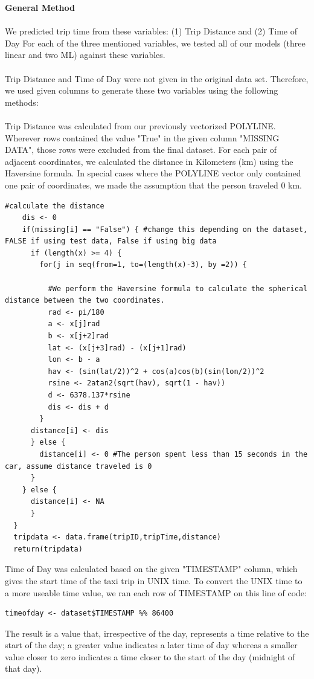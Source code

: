 \documentclass[letterpaper, 12 pt, conference]{article}
\begin{document}
\textbf{General Method}
\\
\\We predicted trip time from these variables: (1) Trip Distance and (2) Time of Day
For each of the three mentioned variables, we tested all of our models (three linear and two ML) against these variables. 
\\
\\
Trip Distance and Time of Day were not given in the original data set. Therefore, we used given columns to generate these two variables using the following methods: 
\\
\\Trip Distance was calculated from our previously vectorized POLYLINE. Wherever rows contained the value "True" in the given column "MISSING DATA", those rows were excluded from the final dataset. For each pair of adjacent coordinates, we calculated the distance in Kilometers (km) using the Haversine formula. In special cases where the POLYLINE vector only contained one pair of coordinates, we made the assumption that the person traveled 0 km.  
\begin{lstlisting}
#calculate the distance
    dis <- 0
    if(missing[i] == "False") { #change this depending on the dataset, FALSE if using test data, False if using big data
      if (length(x) >= 4) {
        for(j in seq(from=1, to=(length(x)-3), by =2)) {

          #We perform the Haversine formula to calculate the spherical distance between the two coordinates.
          rad <- pi/180
          a <- x[j]rad
          b <- x[j+2]rad
          lat <- (x[j+3]rad) - (x[j+1]rad)
          lon <- b - a
          hav <- (sin(lat/2))^2 + cos(a)cos(b)(sin(lon/2))^2
          rsine <- 2atan2(sqrt(hav), sqrt(1 - hav))
          d <- 6378.137*rsine
          dis <- dis + d
        }
      distance[i] <- dis
      } else {
        distance[i] <- 0 #The person spent less than 15 seconds in the car, assume distance traveled is 0
      }
    } else {
      distance[i] <- NA
      }
  }
  tripdata <- data.frame(tripID,tripTime,distance)
  return(tripdata)
\end{lstlisting}
Time of Day was calculated based on the given "TIMESTAMP" column, which gives the start time of the taxi trip in UNIX time. To convert the UNIX time to a more useable time value, we ran each row of TIMESTAMP on this line of code:
\begin{lstlisting}
timeofday <- dataset$TIMESTAMP %% 86400
\end{lstlisting}
The result is a value that, irrespective of the day, represents a time relative to the start of the day; a greater value indicates a later time of day whereas a smaller value closer to zero indicates a time closer to the start of the day (midnight of that day).
\end{document}

